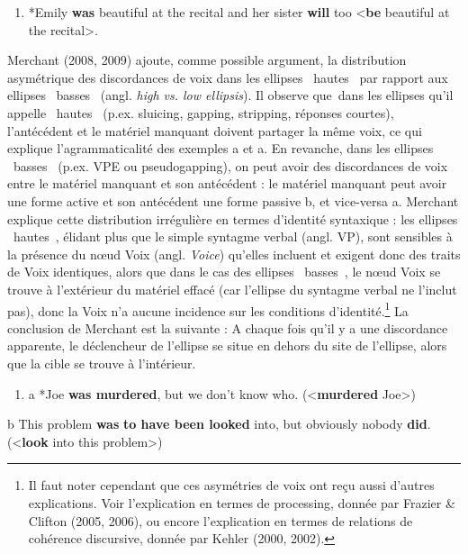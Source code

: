 \begin{enumerate}
\item \label{bkm:Ref306037938}*Emily \textbf{was} beautiful at the recital and her sister \textbf{will} too {\textless}\textbf{be} beautiful at the recital{\textgreater}.  


\end{enumerate}
Merchant (2008, 2009) ajoute, comme possible argument, la distribution asymétrique des discordances de voix dans les ellipses {\guillemotleft}~hautes~{\guillemotright} par rapport aux ellipses {\guillemotleft}~basses~{\guillemotright} (angl. \textit{high vs. low ellipsis}). Il observe que~dans les ellipses qu'il appelle {\guillemotleft}~hautes~{\guillemotright} (p.ex. sluicing, gapping, stripping, réponses courtes), l'antécédent et le matériel manquant doivent partager la même voix, ce qui explique l'agrammaticalité des exemples a et a. En revanche, dans les ellipses {\guillemotleft}~basses~{\guillemotright} (p.ex. VPE ou pseudogapping), on peut avoir des discordances de voix entre le matériel manquant et son antécédent : le matériel manquant peut avoir une forme active et son antécédent une forme passive b, et vice-versa a. Merchant explique cette distribution irrégulière en termes d'identité syntaxique : les ellipses {\guillemotleft}~hautes~{\guillemotright}, élidant plus que le simple syntagme verbal (angl. VP), sont sensibles à la présence du n{\oe}ud Voix (angl. \textit{Voice}) qu'elles incluent et exigent donc des traits de Voix identiques, alors que dans le cas des ellipses {\guillemotleft}~basses~{\guillemotright}, le n{\oe}ud Voix se trouve à l'extérieur du matériel effacé (car l'ellipse du syntagme verbal ne l'inclut pas), donc la Voix n'a aucune incidence sur les conditions d'identité.\footnote{Il faut noter cependant que ces asymétries de voix ont reçu aussi d'autres explications. Voir l'explication en termes de processing, donnée par Frazier \& Clifton (2005, 2006), ou encore l'explication en termes de relations de cohérence discursive, donnée par Kehler (2000, 2002).} La conclusion de Merchant est la suivante : A chaque fois qu'il y a une discordance apparente, le déclencheur de l'ellipse se situe en dehors du site de l'ellipse, alors que la cible se trouve à l'intérieur.


\begin{enumerate}
\item \label{bkm:Ref306039141}a  *Joe \textbf{was murdered}, but we don't know who. ({\textless}\textbf{murdered} Joe{\textgreater}) 


\end{enumerate}
  b  This problem \textbf{was} \textbf{to have been looked} into, but obviously nobody \textbf{did}. ({\textless}\textbf{look} into this problem{\textgreater}) 


